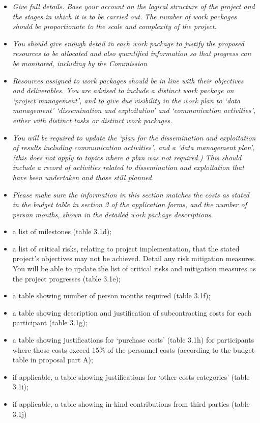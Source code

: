 \begin{itemize}
\item
  \emph{Give full details. Base your account on the logical structure of
  the project and the stages in which it is to be carried out.}
  \emph{The number of work packages should be proportionate to the scale
  and complexity of the project.}
\item
  \emph{You should give enough detail in each work package to justify
  the proposed resources to be allocated and also quantified information
  so that progress can be monitored, including by the Commission}
\item
  \emph{Resources assigned to work packages should be in line with their
  objectives and deliverables. You are advised to include a distinct
  work package on `project management', and to give due visibility in
  the work plan to `data management' `dissemination and exploitation'
  and `communication activities', either with distinct tasks or distinct
  work packages. }
\item
  \emph{You will be required to update the `plan for the dissemination
  and exploitation of results including communication activities', and a
  `data management plan', (this does not apply to topics where a plan
  was not required.) This should include a record of activities related
  to dissemination and exploitation that have been undertaken and those
  still planned. }
\item
  \emph{Please make sure the information in this section matches the
  costs as stated in the budget table in section 3 of the application
  forms, and the number of person months, shown in the detailed work
  package descriptions.}
\end{itemize}

\begin{itemize}
\item
  a list of milestones (table 3.1d);
\item
  a list of critical risks, relating to project implementation, that the
  stated project's objectives may not be achieved. Detail any risk
  mitigation measures. You will be able to update the list of critical
  risks and mitigation measures as the project progresses (table 3.1e);
\item
  a table showing number of person months required (table 3.1f);
\item
  a table showing description and justification of subcontracting costs
  for each participant (table 3.1g);
\item
  a table showing justifications for `purchase costs' (table 3.1h) for
  participants where those costs exceed 15\% of the personnel costs
  (according to the budget table in proposal part A);
\item
  if applicable, a table showing justifications for `other costs
  categories' (table 3.1i);
\item
  if applicable, a table showing in-kind contributions from third
  parties (table 3.1j)
\end{itemize}

